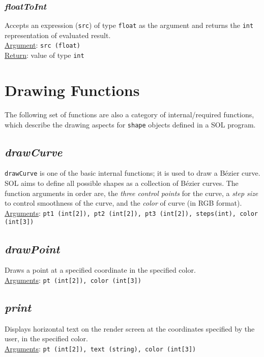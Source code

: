         \subsubsection{\textit{floatToInt}}
        Accepts an expression (\texttt{src}) of type \texttt{float} as the argument and returns the \texttt{int} representation of evaluated result.\\
        \underline{Argument}: \texttt{src (float)}\\
        \underline{Return}: value of type \texttt{int}

\section{Drawing Functions}
The following set of functions are also a category of internal/required functions, which describe the drawing aspects for \texttt{shape} objects defined in a SOL program.

    \subsection{\textit{drawCurve}}
    \texttt{drawCurve} is one of the basic internal functions; it is used to draw a B\'ezier curve. SOL aims to define all possible shapes as a collection of B\'ezier curves. The function arguments in order are, the \textit{three control points} for the curve, a \textit{step size} to control smoothness of the curve, and the \textit{color} of curve (in RGB format).\\
    \underline{Arguments}: \texttt{pt1 (int[2]), pt2 (int[2]), pt3 (int[2]), steps(int), color (int[3])}

    \subsection{\textit{drawPoint}}
    Draws a point at a specified coordinate in the specified color.\\
    \underline{Arguments}: \texttt{pt (int[2]), color (int[3])}

    \subsection{\textit{print}}
    Displays horizontal text on the render screen at the coordinates specified by the user, in the specified color.\\
    \underline{Arguments}: \texttt{pt (int[2]), text (string), color (int[3])}

